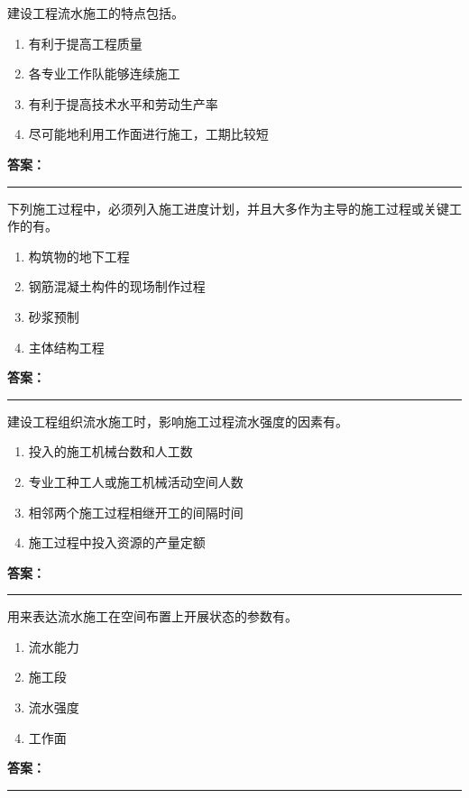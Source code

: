 \documentclass[UTF8,fontset=fandol,11pt]{ctexart}
\newcommand{\answerline}{\textcolor{answerred}{\rule{2.4cm}{0.7pt}}}
\begin{document}
\begin{quizbox}[title={第 17 题}]
建设工程流水施工的特点包括。\\
\begin{enumerate}[label=\Alph*.]
\item 有利于提高工程质量
\item 各专业工作队能够连续施工
\item 有利于提高技术水平和劳动生产率
\item 尽可能地利用工作面进行施工，工期比较短
\end{enumerate}
\textbf{\textcolor{answerred}{答案：}} \answerline
\end{quizbox}

\vspace{0.2em}

\begin{quizbox}[title={第 18 题}]
下列施工过程中，必须列入施工进度计划，并且大多作为主导的施工过程或关键工作的有。\\
\begin{enumerate}[label=\Alph*.]
\item 构筑物的地下工程
\item 钢筋混凝土构件的现场制作过程
\item 砂浆预制
\item 主体结构工程
\end{enumerate}
\textbf{\textcolor{answerred}{答案：}} \answerline
\end{quizbox}

\vspace{0.2em}

\begin{quizbox}[title={第 19 题}]
建设工程组织流水施工时，影响施工过程流水强度的因素有。\\
\begin{enumerate}[label=\Alph*.]
\item 投入的施工机械台数和人工数
\item 专业工种工人或施工机械活动空间人数
\item 相邻两个施工过程相继开工的间隔时间
\item 施工过程中投入资源的产量定额
\end{enumerate}
\textbf{\textcolor{answerred}{答案：}} \answerline
\end{quizbox}

\vspace{0.2em}

\begin{quizbox}[title={第 20 题}]
用来表达流水施工在空间布置上开展状态的参数有。\\
\begin{enumerate}[label=\Alph*.]
\item 流水能力
\item 施工段
\item 流水强度
\item 工作面
\end{enumerate}
\textbf{\textcolor{answerred}{答案：}} \answerline
\end{quizbox}
\end{document}
